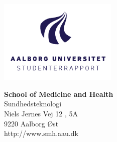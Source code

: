

{}
\thispagestyle{empty}

\begin{minipage}[t]{0.48\textwidth}
\vspace*{-25pt}			%
\includegraphics[height=4cm]{figures/AAU-logo-stud-DK-RGB}
\end{minipage}
\hfill
\begin{minipage}[t]{0.48\textwidth}
{\small 
\textbf{School of Medicine and Health}\\
Sundhedsteknologi \\
Niels Jernes Vej 12 , 5A\\
9220 Aalborg Øst \\
http://www.smh.aau.dk}
\end{minipage}

\vspace*{1cm}

